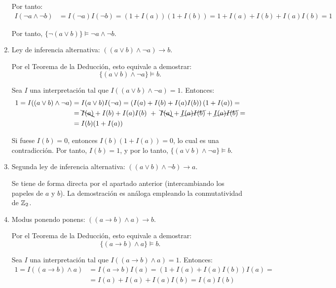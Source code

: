 \begin{ejercicio}
\begin{enumerate}
        Por tanto:
        \begin{align*}
            I(\neg a \land \neg b) &= I(\neg a)I(\neg b) = (1+I(a))(1+I(b)) = 1+I(a)+I(b)+I(a)I(b) = 1
        \end{align*}

        Por tanto, $\{\neg(a\lor b)\} \models \neg a \land \neg b$.
        \item Ley de inferencia alternativa: $((a\lor b)\land \neg a) \rightarrow b$.
        
        Por el Teorema de la Deducción, esto equivale a demostrar:
        \begin{equation*}
            \{(a\lor b)\land \neg a\} \models b.
        \end{equation*}

        Sea $I$ una interpretación tal que $I((a\lor b)\land \neg a) = 1$. Entonces:
        \begin{align*}
            1=I((a\lor b)\land \neg a) &= I(a\lor b)I(\neg a) = \left(I(a)+I(b)+I(a)I(b)\right)\left(1+I(a)\right) =\\&= \bcancel{I(a)}+I(b)+I(a)I(b)\ +\ \bcancel{I(a)}+\cancel{I(a)I(b)} + \cancel{I(a)I(b)}
            =\\&= I(b)(1+I(a))
        \end{align*}

        Si fuese $I(b) = 0$, entonces $I(b)(1+I(a)) = 0$, lo cual es una contradicción. Por tanto, $I(b) = 1$, y por lo tanto, $\{(a\lor b)\land \neg a\} \models b$.
        \item Segunda ley de inferencia alternativa: $((a\lor b)\land \neg b) \rightarrow a$.
        
        Se tiene de forma directa por el apartado anterior (intercambiando los papeles de $a$ y $b$). La demostración es análoga empleando la conmutatividad de $\mathbb{Z}_2$.
        \item Modus ponendo ponens: $((a \rightarrow b)\land a) \rightarrow b$.
        
        Por el Teorema de la Deducción, esto equivale a demostrar:
        \begin{equation*}
            \{(a \rightarrow b)\land a\} \models b.
        \end{equation*}

        Sea $I$ una interpretación tal que $I((a \rightarrow b)\land a) = 1$. Entonces:
        \begin{align*}
            1=I((a \rightarrow b)\land a) &= I(a \rightarrow b)I(a) = \left(1+I(a)+I(a)I(b)\right)I(a) =\\&= I(a)+I(a)+I(a)I(b) = I(a)I(b)
        \end{align*}


\end{enumerate}
\end{ejercicio}
